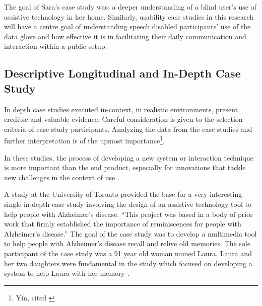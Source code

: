 The goal of Sara’s case study was: a deeper understanding of a blind user’s use of assistive technology in her home.  Similarly, usability case studies in this research will have a centre goal of understanding speech disabled participants’ use of the data glove and how effective it is in facilitating their daily communication and interaction within a public setup. 

\subsection{Descriptive Longitudinal and In-Depth Case Study}

In depth case studies executed in-context, in realistic environments, present credible and valuable evidence.  Careful consideration is given to the selection criteria of case study participants. Analyzing the data from the case studies and further interpretation is of the upmost importance\footnote{Yin, cited  \parencite{Lazar2010}}.

In these studies, the process of developing a new system or interaction technique is more important than the end product, especially for innovations that tackle new challenges in the context of use \parencite{Cohene2007}. 

A study at the University of Toronto \parencite{Cohene2007} provided the base for a very interesting single in-depth case study involving the design of an assistive technology tool to help people with Alzheimer’s disease. ``This project was based in a body of prior work that firmly established the importance of reminiscences for people with Alzheimer’s disease.'' \parencite{Cohene2007} The goal of the case study was to develop a multimedia tool to help people with Alzheimer’s disease recall and relive old memories. The sole participant of the case study was a 91 year old woman named Laura. Laura and her two daughters were fundamental in the study which focused on developing a system to help Laura with her memory \parencite{Cohene2007}. 

